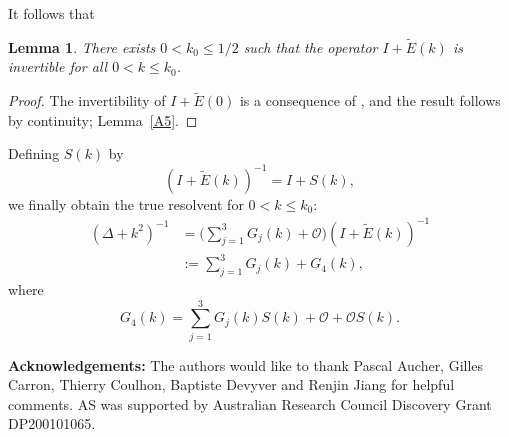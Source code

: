 \documentclass[12pt]{amsart}
\newtheorem{lemma}[theorem]{Lemma}
\begin{document}
It follows that

\begin{lemma}
There exists $0<k_0\le 1/2$ such that the operator $I+\tilde{E}(k)$ is invertible for all $0<k\le k_0$. 
\end{lemma}

\begin{proof}
The invertibility of $I+\tilde{E}(0)$ is a consequence of \cite[Lemma~3.5]{HNS}, and the result follows by continuity; Lemma~\ref{A5}.
\end{proof}


Defining $S(k)$ by
\[
(I+\tilde{E}(k))^{-1} = I + S(k),
\]
we finally obtain the true resolvent for $0<k\le k_0$:
\begin{align}\label{parametrix_R2}
(\Delta+k^2)^{-1} 
&= \Bigg(\sum_{j=1}^3 G_j(k) + \mathcal{O}\Bigg)(I+\tilde{E}(k))^{-1} \\
&:= \sum_{j=1}^3 G_j(k) + G_4(k),
\end{align}
where
\[
G_4(k) = \sum_{j=1}^3 G_j(k)S(k) + \mathcal{O} + \mathcal{O}S(k).
\]




\bigskip

\noindent
{\bf Acknowledgements:} The authors would like to thank Pascal Aucher, Gilles Carron, Thierry Coulhon, Baptiste Devyver and Renjin Jiang  for helpful comments. AS was supported by Australian Research Council  Discovery Grant  DP200101065.
\end{document}
